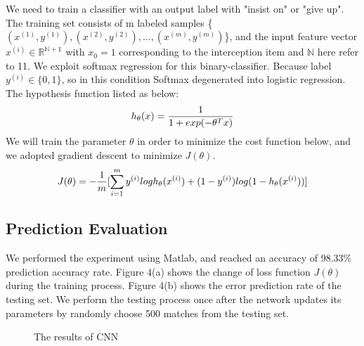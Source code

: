 \documentclass[a4paper, 11pt]{article} %
\begin{document}
We need to train a classifier with an output label with "insist on" or "give up". The training set consists of m labeled samples \{${(x^{(1)},y^{(1)}),(x^{(2)},y^{(2)}), \dots,(x^{(m)},y^{(m)})}$\}, and the input feature vector $x^{(i)} \in \mathbb{R^{N+1}}$ with $x_0 = 1$ corresponding to the interception item and $\mathbb{N}$ here refer to 11. We exploit softmax regression for this binary-classifier. Because label $y^{(i)} \in \{0,1\}$, so in this condition Softmax degenerated into logistic regression. The hypothesis function listed as below:
 \begin{equation*}
 \centering
 h_\theta(x) = \frac{1}{1+exp(-\theta^Tx)}
 \end{equation*}
We will train the parameter $\theta$ in order to minimize the cost function below, and we adopted gradient descent to minimize $J(\theta)$.
 \begin{equation*}
 \centering
 J(\theta) = -\frac{1}{m}[\sum_{i=1}^{m}y^{(i)}logh_\theta(x^{(i)})+(1-y^{(i)})log(1-h_\theta(x^{(i)}))]
 \end{equation*}
 

\subsection{Prediction Evaluation}
We performed the experiment using Matlab, and reached an accuracy of 98.33\% prediction accuracy rate.
Figure 4(a) shows the change of loss function $J(\theta)$ during the training process. Figure 4(b) shows the error prediction rate of the testing set. We perform the testing process once after the network updates its parameters by randomly choose 500 matches from the testing set.
\begin{figure}[h]
	\centering 
	\caption{The results of CNN}
	\label{fig:subfig}
\end{figure}
\end{document}
